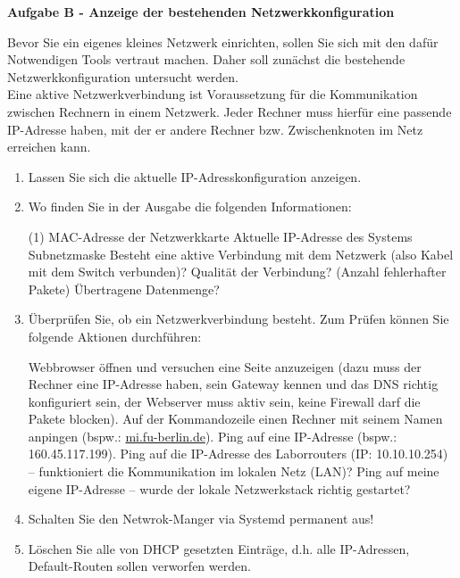 \documentclass[paper=a4,fontsize=11pt]{scrartcl}%
\numberwithin{equation}{section}
\begin{document}
\begin{center}
\Large{\textbf{Aufgabe B - Anzeige der bestehenden Netzwerkkonfiguration}}
\end{center}\vskip0.25in
Bevor Sie ein eigenes kleines Netzwerk einrichten, sollen Sie sich mit den dafür Notwendigen Tools vertraut machen. Daher soll zunächst die bestehende Netzwerkkonfiguration untersucht werden.\\
Eine aktive Netzwerkverbindung ist Voraussetzung für die Kommunikation zwischen Rechnern in einem Netzwerk. Jeder Rechner muss hierfür eine passende IP-Adresse haben, mit der er andere Rechner bzw. Zwischenknoten im Netz erreichen kann.
\begin{enumerate}
	\item Lassen Sie sich die aktuelle IP-Adresskonfiguration anzeigen.
	\item Wo finden Sie in der Ausgabe die folgenden Informationen:
	\begin{tasks}(1)
		\task MAC-Adresse der Netzwerkkarte
		\task Aktuelle IP-Adresse des Systems
		\task Subnetzmaske
		\task Besteht eine aktive Verbindung mit dem Netzwerk (also Kabel mit dem Switch verbunden)?
		\task Qualität der Verbindung? (Anzahl fehlerhafter Pakete)
		\task Übertragene Datenmenge?
	\end{tasks}
	\item Überprüfen Sie, ob ein Netzwerkverbindung besteht. Zum Prüfen können Sie folgende Aktionen durchführen:
	\begin{tasks}
		\task Webbrowser öffnen und versuchen eine Seite anzuzeigen (dazu muss der Rechner eine IP-Adresse
haben, sein Gateway kennen und das DNS richtig konfiguriert sein, der Webserver muss aktiv sein, keine Firewall darf die Pakete blocken).
		\task Auf der Kommandozeile einen Rechner mit seinem Namen anpingen (bspw.: \url{mi.fu-berlin.de}).
		\task Ping auf eine IP-Adresse (bspw.: 160.45.117.199).
		\task Ping auf die IP-Adresse des Laborrouters (IP: 10.10.10.254) -- funktioniert die Kommunikation im lokalen Netz (LAN)?
		\task Ping auf meine eigene IP-Adresse -- wurde der lokale Netzwerkstack richtig gestartet?
	\end{tasks}
	\item Schalten Sie den Netwrok-Manger via Systemd permanent aus!
	\item Löschen Sie alle von DHCP gesetzten Einträge, d.h. alle IP-Adressen, Default-Routen sollen verworfen werden.
\end{enumerate}
\end{document}
